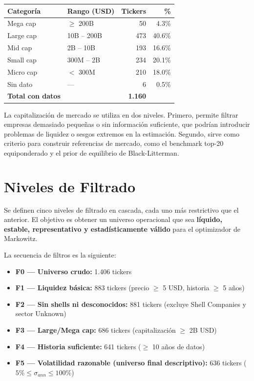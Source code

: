 \begin{center}
\begin{tabular}{llrr}
  \toprule
  \textbf{Categoría} & \textbf{Rango (USD)} & \textbf{Tickers} & \textbf{\%} \\
  \midrule
  Mega cap   & $\geq$ 200B    &  50 &  4.3\% \\
  Large cap  & 10B -- 200B    & 473 & 40.6\% \\
  Mid cap    & 2B -- 10B      & 193 & 16.6\% \\
  Small cap  & 300M -- 2B     & 234 & 20.1\% \\
  Micro cap  & $<$ 300M       & 210 & 18.0\% \\
  \midrule
  Sin dato   & ---            &   6 &  0.5\% \\
  \midrule
  \textbf{Total con datos} & & \textbf{1.160} & \\
  \bottomrule
\end{tabular}
\end{center}

La capitalización de mercado se utiliza en dos niveles. Primero, permite
filtrar empresas demasiado pequeñas o sin información suficiente, que podrían
introducir problemas de liquidez o sesgos extremos en la estimación. Segundo,
sirve como criterio para construir referencias de mercado, como el benchmark
top-20 equiponderado y el prior de equilibrio de Black-Litterman.

\section*{Niveles de Filtrado}

Se definen cinco niveles de filtrado en cascada, cada uno más restrictivo
que el anterior. El objetivo es obtener un universo operacional que sea
\textbf{líquido, estable, representativo y estadísticamente válido}
para el optimizador de Markowitz.

La secuencia de filtros es la siguiente:

\begin{itemize}
  \item \textbf{F0 --- Universo crudo:} 1.406 tickers
  \item \textbf{F1 --- Liquidez básica:} 883 tickers (precio $\geq$ 5 USD, historia $\geq$ 5 años)
  \item \textbf{F2 --- Sin shells ni desconocidos:} 881 tickers (excluye Shell Companies y sector Unknown)
  \item \textbf{F3 --- Large/Mega cap:} 686 tickers (capitalización $\geq$ 2B USD)
  \item \textbf{F4 --- Historia suficiente:} 641 tickers ($\geq$ 10 años de datos)
  \item \textbf{F5 --- Volatilidad razonable (universo final descriptivo):} 636 tickers ($5\% \leq \sigma_{ann} \leq 100\%$)
\end{itemize}

